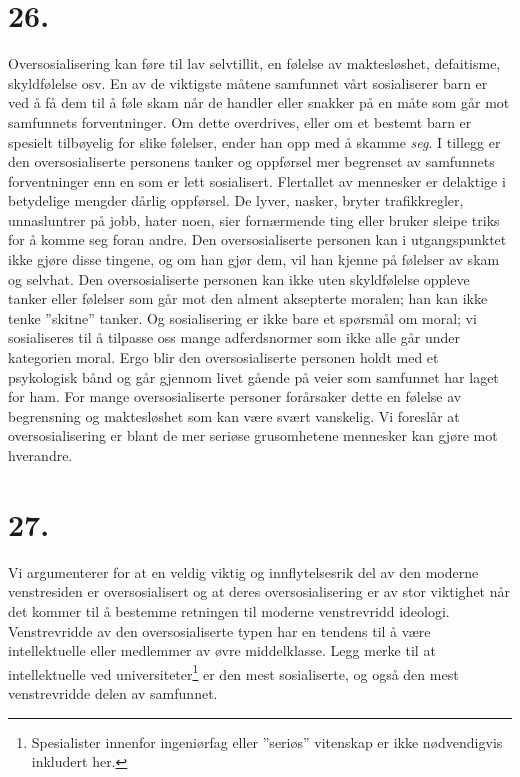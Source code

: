 \documentclass[oneside]{book}
\begin{document}
\section*{26.}
Oversosialisering kan føre til lav selvtillit, en følelse av maktesløshet, defaitisme, skyldfølelse osv. En av de viktigste måtene samfunnet vårt sosialiserer barn er ved å få dem til å føle skam når de handler eller snakker på en måte som går mot samfunnets forventninger. Om dette overdrives, eller om et bestemt barn er spesielt tilbøyelig for slike følelser, ender han opp med å skamme {\em seg}. I tillegg er den oversosialiserte personens tanker og oppførsel mer begrenset av samfunnets forventninger enn en som er lett sosialisert. Flertallet av mennesker er delaktige i betydelige mengder dårlig oppførsel. De lyver, nasker, bryter trafikkregler, unnasluntrer på jobb, hater noen, sier fornærmende ting eller bruker sleipe triks for å komme seg foran andre. Den oversosialiserte personen kan i utgangspunktet ikke gjøre disse tingene, og om han gjør dem, vil han kjenne på følelser av skam og selvhat. Den oversosialiserte personen kan ikke uten skyldfølelse oppleve tanker eller følelser som går mot den alment aksepterte moralen; han kan ikke tenke ''skitne'' tanker. Og sosialisering er ikke bare et spørsmål om moral; vi sosialiseres til å tilpasse oss mange adferdsnormer som ikke alle går under kategorien moral. Ergo blir den oversosialiserte personen holdt med et psykologisk bånd og går gjennom livet gående på veier som samfunnet har laget for ham. For mange oversosialiserte personer forårsaker dette en følelse av begrensning og maktesløshet som kan være svært vanskelig. Vi foreslår at oversosialisering er blant de mer seriøse grusomhetene mennesker kan gjøre mot hverandre.

\section*{27.}
Vi argumenterer for at en veldig viktig og innflytelsesrik del av den moderne venstresiden er oversosialisert og at deres oversosialisering er av stor viktighet når det kommer til å bestemme retningen til moderne venstrevridd ideologi. Venstrevridde av den oversosialiserte typen har en tendens til å være intellektuelle eller medlemmer av øvre middelklasse. Legg merke til at intellektuelle ved universiteter\footnote{Spesialister innenfor ingeniørfag eller ''seriøs'' vitenskap er ikke nødvendigvis inkludert her.} er den mest sosialiserte, og også den mest venstrevridde delen av samfunnet.
\end{document}
